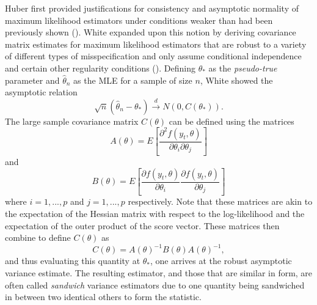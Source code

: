 \documentclass[12pt]{article} %
\theoremstyle{definition}
\begin{document}
		Huber first provided justifications for consistency and asymptotic normality of maximum likelihood estimators under conditions weaker than had been previously shown (\cite{Huber}). White
		expanded upon this notion by deriving covariance matrix estimates for maximum likelihood estimators that are robust to a variety of different types of misspecification and only assume
		conditional independence and certain other regularity conditions (\cite{White1980}). Defining $\theta_*$ as the \textit{pseudo-true} parameter and $\hat{\theta}_n$ as the MLE for a sample of size
		$n$, White showed the asymptotic relation
		\begin{equation*}
			\sqrt{n} (\hat{\theta}_n - \theta_*) \xrightarrow[]{d} N(0, C(\theta_* ) ) .
		\end{equation*}
		The large sample covariance matrix $C(\theta)$ can be defined using the matrices 
		\begin{equation*}
			A(\theta) = E \left[ \frac{\partial^2 f(y_t,\theta)}{\partial \theta_i \partial \theta_j} \right] 
		\end{equation*}
		and
		\begin{equation*}
			B(\theta) = E \left[ \frac{\partial f(y_t,\theta)}{\partial \theta_i} \frac{\partial f(y_t,\theta)}{\partial \theta_j} \right] 
		\end{equation*}
		where $i = 1,...,p$ and $j = 1,...,p$ respectively. Note that these matrices are akin to the expectation of the Hessian matrix with respect to the log-likelihood and the expectation of
		the outer product of the score vector. These matrices then combine to define $C(\theta)$ as
		\begin{equation*}
			C(\theta) = A(\theta)^{-1} B(\theta) A(\theta)^{-1} ,
		\end{equation*}
		and thus evaluating this quantity at $\theta_*$, one arrives at the robust asymptotic variance estimate. The resulting estimator, and those that are similar in form, are often called \textit{sandwich}
		variance estimators due to one quantity being sandwiched in between two identical others to form the statistic.
\end{document}
